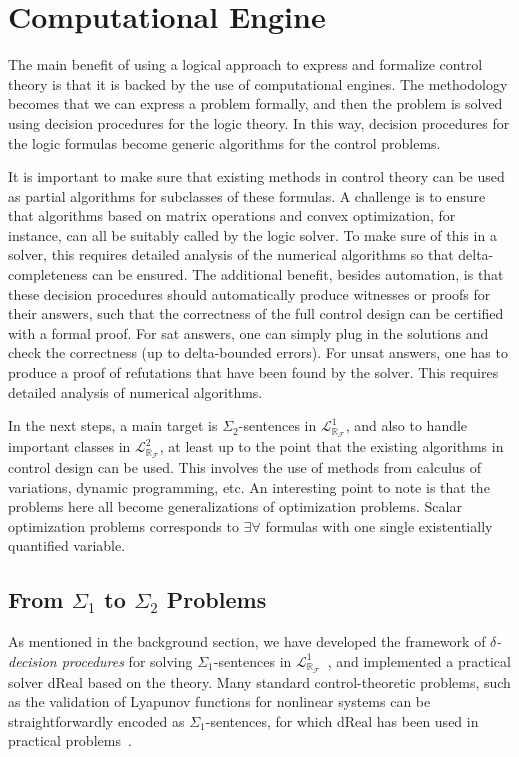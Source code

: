 \documentclass[11pt]{article}
\newcommand{\lrf}{\mathcal{L}_{\mathbb{R}_{\mathcal{F}}}}
\theoremstyle{definition}
\begin{document}
\section{Computational Engine}\label{ce}

The main benefit of using a logical approach to express and formalize control theory is that it is backed by the use of computational engines. The methodology becomes that we can express a problem formally, and then the problem is solved using decision procedures for the logic theory. In this way, decision procedures for the logic formulas become generic algorithms for the control problems. 

It is important to make sure that existing methods in control theory can be used as partial algorithms for subclasses of these formulas. A challenge is to ensure that algorithms based on matrix operations and convex optimization, for instance, can all be suitably called by the logic solver. To make sure of this in a solver, this requires detailed analysis of the numerical algorithms so that delta-completeness can be ensured. The additional benefit, besides automation, is that these decision procedures should automatically produce witnesses or proofs for their answers, such that the correctness of the full control design can be certified with a formal proof. For sat answers, one can simply plug in the solutions and check the correctness (up to delta-bounded errors). For unsat answers, one has to produce a proof of refutations that have been found by the solver. This requires detailed analysis of numerical algorithms.

In the next steps, a main target is $\Sigma_2$-sentences in $\lrf^1$, and also to handle important classes in $\lrf^2$, at least up to the point that the existing algorithms in control design can be used. This involves the use of methods from calculus of variations, dynamic programming, etc. An interesting point to note is that the problems here all become generalizations of optimization problems. Scalar optimization problems corresponds to $\exists\forall$ formulas with one single existentially quantified variable. 

\subsection{From $\Sigma_1$ to $\Sigma_2$ Problems} 

As mentioned in the background section, we have developed the framework of {\em $\delta$-decision procedures} for solving $\Sigma_1$-sentences in $\lrf^1$~\cite{DBLP:conf/cade/GaoAC12}, and implemented a practical solver dReal based on the theory. Many standard control-theoretic problems, such as the validation of Lyapunov functions for nonlinear systems can be straightforwardly encoded as $\Sigma_1$-sentences, for which dReal has been used in practical problems~\cite{DBLP:conf/hybrid/KapinskiDSA14}.
\end{document}
